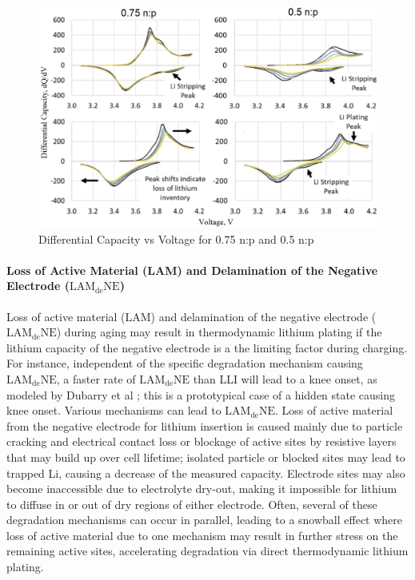 \documentclass{article}
\newcommand{\pbox}[1]{{
\fbox{
\parbox{0.8\textwidth}{  \fbox{$\triangleright$\textcolor{blue}{\textbf{From Peter}:}} 
#1
}}}}
\begin{document}
\begin{figure}
\centering
\includegraphics[scale = 0.4]{images/Differential Capacity vs Voltage.jpg}
\caption{Differential Capacity vs Voltage for 0.75 n:p and 0.5 n:p \cite{deichmann_investigating_2020}}
\label{fig:DiffCapVoltageNP}
\end{figure}


\paragraph{Loss of Active Material (LAM) and Delamination of the Negative Electrode ($\mathrm{LAM_{de}NE}$)}

\pbox{READY FOR EDITING}
Loss of active material (LAM) and delamination of the negative electrode ($\mathrm{LAM_{de}NE}$) during aging may result in thermodynamic lithium plating if the lithium capacity of the negative electrode is a the limiting factor during charging. For instance, independent of the specific degradation mechanism causing $\mathrm{LAM_{de}NE}$, a faster rate of $\mathrm{LAM_{de}NE}$ than LLI will lead to a knee onset, as modeled by Dubarry et al \cite{dubarry_durability_2018}; this is a prototypical case of a hidden state causing knee onset. Various mechanisms can lead to $\mathrm{LAM_{de}NE}$. Loss of active material from the negative electrode for lithium insertion is caused mainly due to particle cracking and electrical contact loss or blockage of active sites by resistive layers that may build up over cell lifetime; isolated particle or blocked sites may lead to trapped Li, causing a decrease of the measured capacity. Electrode sites may also become inaccessible due to electrolyte dry-out, making it impossible for lithium to diffuse in or out of dry regions of either electrode. Often, several of these degradation mechanisms can occur in parallel, leading to a snowball effect where loss of active material due to one mechanism may result in further stress on the remaining active sites, accelerating degradation via direct thermodynamic lithium plating. 
\end{document}
